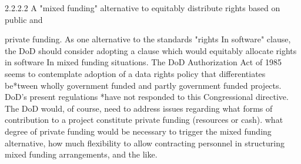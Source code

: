 \documentclass[12pt]{article}
\begin{document}
2.2.2.2 A
"mixed funding" alternative to equitably distribute rights based on public and

private funding.
As one alternative to the standards "rights In software" clause, the DoD should consider adopting a
clause which would equitably allocate rights in software In mixed funding situations. The DoD Authorization Act of 1985 seems to contemplate adoption of a data rights policy that differentiates be*tween wholly government funded and partly government funded projects. DoD's present regulations
*have not responded to this Congressional directive. The DoD would, of course, need to address
issues regarding what forms of contribution to a project constitute private funding (resources or cash).
what degree of private funding would be necessary to trigger the mixed funding alternative, how much
flexibility to allow contracting personnel in structuring mixed funding arrangements, and the like.
\end{document}
